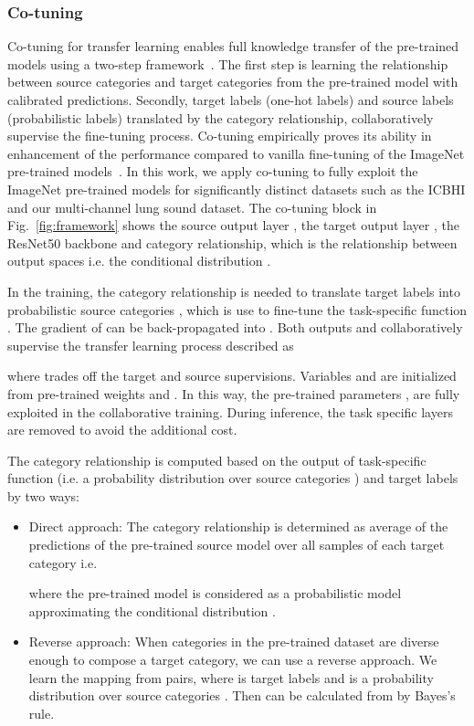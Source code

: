 \documentclass[journal]{IEEEtran}
\begin{document}
\subsubsection{Co-tuning}
Co-tuning for transfer learning enables full knowledge transfer of the   pre-trained models using a two-step framework~\cite{you2020co}. The first step is learning the relationship between source categories and target categories from the pre-trained model with calibrated predictions. Secondly, target labels (one-hot labels) and source labels (probabilistic labels) translated by the category relationship, collaboratively supervise the fine-tuning process. Co-tuning empirically proves its ability in enhancement of the performance compared to vanilla fine-tuning of the ImageNet pre-trained models~\cite{you2020co}. In this work, we apply co-tuning to fully exploit the ImageNet pre-trained models for significantly distinct datasets such as the ICBHI  and our multi-channel lung sound dataset. The co-tuning block in Fig.~\ref{fig:framework} shows the source output layer , the target output layer , the ResNet50 backbone  and category relationship, which is the relationship between output spaces i.e. the conditional distribution . 

In the training, the category relationship  is needed to translate target labels  into probabilistic source categories , which is use to fine-tune the  task-specific function . The gradient of  can be back-propagated into . Both outputs  and  collaboratively supervise the transfer learning  process described as

where  trades off the target and source supervisions. Variables  and  are initialized from pre-trained weights  and . In this way, the pre-trained parameters ,  are fully exploited in the collaborative training. During inference, the task specific layers  are removed to avoid the additional cost.

The category relationship  is computed based on the output of task-specific function  (i.e. a probability distribution over source categories ) and target labels  by two ways: 
\begin{itemize}
	\item Direct approach: The category relationship is determined as average of the predictions of the pre-trained source model over all samples of each target category i.e.

where the pre-trained model  is considered as a probabilistic model approximating the conditional distribution . 

\item Reverse approach: When categories in the pre-trained dataset are diverse enough to compose a target category, we can use a reverse approach. We learn the mapping  from  pairs, where  is target labels and  is a probability distribution over source categories . Then  can be calculated from  by Bayes's rule.

\end{itemize}
\end{document}
